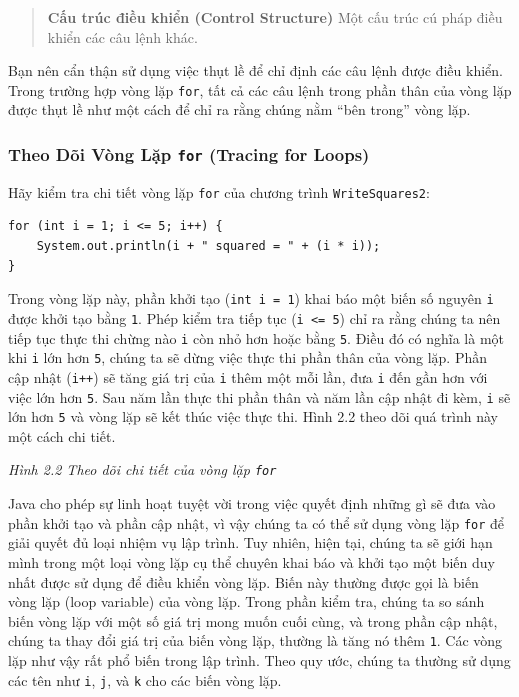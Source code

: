 \begin{quote}
\textbf{Cấu trúc điều khiển (Control Structure)} Một cấu trúc cú pháp
điều khiển các câu lệnh khác.
\end{quote}

Bạn nên cẩn thận sử dụng việc thụt lề để chỉ định các câu lệnh được điều
khiển. Trong trường hợp vòng lặp \texttt{for}, tất cả các câu lệnh trong
phần thân của vòng lặp được thụt lề như một cách để chỉ ra rằng chúng
nằm ``bên trong'' vòng lặp.

\subsubsection{\texorpdfstring{Theo Dõi Vòng Lặp \texttt{for} (Tracing
for
Loops)}{Theo Dõi Vòng Lặp for (Tracing for Loops)}}\label{theo-duxf5i-vuxf2ng-lux1eb7p-for-tracing-for-loops}

Hãy kiểm tra chi tiết vòng lặp \texttt{for} của chương trình
\texttt{WriteSquares2}:

\begin{verbatim}
for (int i = 1; i <= 5; i++) {
    System.out.println(i + " squared = " + (i * i));
}
\end{verbatim}

Trong vòng lặp này, phần khởi tạo (\texttt{int\ i\ =\ 1}) khai báo một
biến số nguyên \texttt{i} được khởi tạo bằng \texttt{1}. Phép kiểm tra
tiếp tục (\texttt{i\ \textless{}=\ 5}) chỉ ra rằng chúng ta nên tiếp tục
thực thi chừng nào \texttt{i} còn nhỏ hơn hoặc bằng \texttt{5}. Điều đó
có nghĩa là một khi \texttt{i} lớn hơn \texttt{5}, chúng ta sẽ dừng việc
thực thi phần thân của vòng lặp. Phần cập nhật (\texttt{i++}) sẽ tăng
giá trị của \texttt{i} thêm một mỗi lần, đưa \texttt{i} đến gần hơn với
việc lớn hơn \texttt{5}. Sau năm lần thực thi phần thân và năm lần cập
nhật đi kèm, \texttt{i} sẽ lớn hơn \texttt{5} và vòng lặp sẽ kết thúc
việc thực thi. Hình 2.2 theo dõi quá trình này một cách chi tiết.

\emph{Hình 2.2 Theo dõi chi tiết của vòng lặp \texttt{for}}

Java cho phép sự linh hoạt tuyệt vời trong việc quyết định những gì sẽ
đưa vào phần khởi tạo và phần cập nhật, vì vậy chúng ta có thể sử dụng
vòng lặp \texttt{for} để giải quyết đủ loại nhiệm vụ lập trình. Tuy
nhiên, hiện tại, chúng ta sẽ giới hạn mình trong một loại vòng lặp cụ
thể chuyên khai báo và khởi tạo một biến duy nhất được sử dụng để điều
khiển vòng lặp. Biến này thường được gọi là biến vòng lặp (loop
variable) của vòng lặp. Trong phần kiểm tra, chúng ta so sánh biến vòng
lặp với một số giá trị mong muốn cuối cùng, và trong phần cập nhật,
chúng ta thay đổi giá trị của biến vòng lặp, thường là tăng nó thêm
\texttt{1}. Các vòng lặp như vậy rất phổ biến trong lập trình. Theo quy
ước, chúng ta thường sử dụng các tên như \texttt{i}, \texttt{j}, và
\texttt{k} cho các biến vòng lặp.

